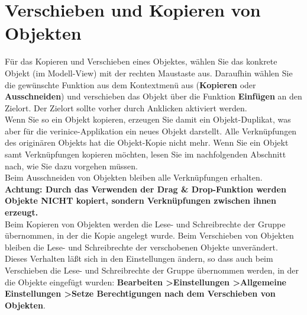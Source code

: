 \documentclass[a4paper,10pt]{book}
\begin{document}
\section{Verschieben und Kopieren von Objekten}
Für das Kopieren und Verschieben eines Objektes, wählen Sie das konkrete Objekt (im Modell-View) mit der rechten Maustaste aus. Daraufhin wählen Sie die gewünschte Funktion aus
dem Kontextmenü aus (\textbf{Kopieren} oder \textbf{Ausschneiden}) und verschieben das Objekt über die Funktion \textbf{Einfügen} an den Zielort.
Der Zielort sollte vorher durch Anklicken aktiviert werden.
\newline\\
Wenn Sie so ein Objekt kopieren, erzeugen Sie damit ein Objekt-Duplikat, was aber für die verinice-Applikation ein neues Objekt darstellt.
Alle Verknüpfungen des originären Objekts hat die Objekt-Kopie nicht mehr. Wenn Sie ein Objekt samt Verknüpfungen kopieren möchten, lesen Sie im
nachfolgenden Abschnitt nach, wie Sie dazu vorgehen müssen.
\newline\\
Beim Ausschneiden von Objekten bleiben alle Verknüpfungen erhalten.
\newline\\
\textbf{Achtung: Durch das Verwenden der Drag \& Drop-Funktion werden Objekte NICHT kopiert, sondern Verknüpfungen zwischen ihnen erzeugt.}
\newline\\
Beim Kopieren von Objekten werden die Lese- und Schreibrechte der Gruppe übernommen, in der die Kopie angelegt wurde. Beim Verschieben von Objekten bleiben die Lese- und Schreibrechte der verschobenen Objekte unverändert. Dieses Verhalten läßt sich in den Einstellungen ändern, so dass auch beim Verschieben die Lese- und Schreibrechte der Gruppe übernommen werden, in der die Objekte eingefügt wurden: \textbf{Bearbeiten \textgreater Einstellungen \textgreater Allgemeine Einstellungen
  \textgreater Setze Berechtigungen nach dem Verschieben von Objekten}.
\end{document}
